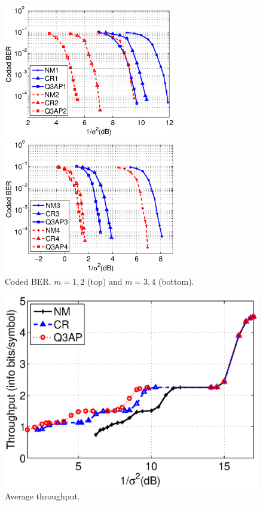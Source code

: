 \documentclass[journal,draftcls,onecolumn,12pt,twoside]{IEEEtran}
\begin{document}
\begin{figure}[!t]
  \centering
  \begin{minipage}[b]{0.9\columnwidth}
    \centering
    \centerline{\includegraphics[width=7.5cm]{./figs/waterfall_64QAM_12.eps}}
  \end{minipage}
  \hfill
  \begin{minipage}[b]{0.9\columnwidth}
    \centering
    \centerline{\includegraphics[width=7.5cm]{./figs/waterfall_64QAM_34.eps}}
  \end{minipage}
  \caption{Coded BER. $m=1, 2$ (top) and $m=3,4$ (bottom).}
  \label{fig:coded}
\end{figure}

\begin{figure}[!t]
  \centering
  \includegraphics[width=0.45\columnwidth]{./figs/throughput.eps}
  \caption{Average throughput.}
  \label{fig:coded_throughput}
\end{figure}
\end{document}
